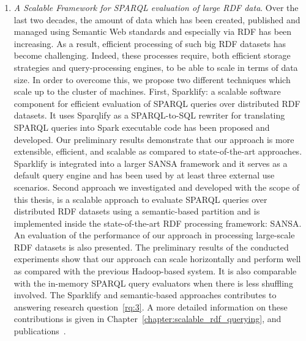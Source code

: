 \begin{enumerate}
    \item \textit{A Scalable Framework for SPARQL evaluation of large RDF data}.
    Over the last two decades, the amount of data which has been created, published and managed using Semantic Web standards and especially via \gls{RDF} has been increasing.
    As a result, efficient processing of such big RDF datasets has become challenging.
    Indeed, these processes require, both efficient storage strategies and query-processing engines, to be able to scale in terms of data size.
    In order to overcome this, we propose two different techniques which scale up to the cluster of machines.
    First, Sparklify: a scalable software component for efficient evaluation of SPARQL queries over distributed RDF datasets. It uses Sparqlify as a SPARQL-to-SQL rewriter for translating SPARQL queries into Spark executable code has been proposed and developed.
    Our preliminary results demonstrate that our approach is more extensible, efficient, and scalable as compared to state-of-the-art approaches.
    Sparklify is integrated into a larger SANSA framework and it serves as a default query engine and has been used by at least three external use scenarios.
    Second approach we investigated and developed with the scope of this thesis, is a scalable approach to evaluate SPARQL queries over distributed RDF datasets using a semantic-based partition and is implemented inside the state-of-the-art RDF processing framework: SANSA.
    An evaluation of the performance of our approach in processing large-scale RDF datasets is also presented. 
    The preliminary results of the conducted experiments show that our approach can scale horizontally and perform well as compared with the previous Hadoop-based system.
    It is also comparable with the in-memory SPARQL query evaluators when there is less shuffling involved.
    The Sparklify and semantic-based approaches contributes to answering research question~\ref{rq:3}.
    A more detailed information on these contributions is given in Chapter~\ref{chapter:scalable_rdf_querying}, and publications~\cite{2019-sansa-sparklify-iswc, sejdiu-2019-sansa-semantic-based-semantics, sansa-sparklify-ISWC-demo}.
    

\end{enumerate}
